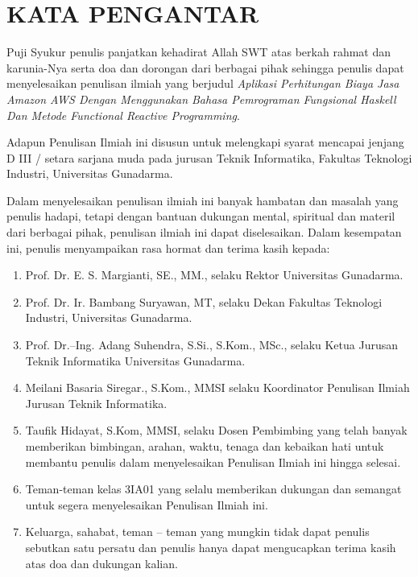 \documentclass[pi.tex]{subfile}
\begin{document}
\chapter*{KATA PENGANTAR}

Puji Syukur penulis panjatkan kehadirat Allah SWT atas berkah rahmat dan karunia-Nya serta doa dan dorongan dari berbagai pihak sehingga penulis dapat menyelesaikan penulisan ilmiah yang berjudul \emph{Aplikasi Perhitungan Biaya Jasa Amazon AWS Dengan Menggunakan Bahasa Pemrograman Fungsional Haskell Dan Metode Functional Reactive Programming}.

Adapun Penulisan Ilmiah ini disusun untuk melengkapi syarat mencapai jenjang D III / setara sarjana muda pada jurusan Teknik Informatika, Fakultas Teknologi Industri, Universitas Gunadarma.

Dalam menyelesaikan penulisan ilmiah ini banyak hambatan dan masalah yang penulis hadapi, tetapi dengan bantuan dukungan mental, spiritual dan materil dari berbagai pihak, penulisan ilmiah ini dapat diselesaikan. Dalam kesempatan ini, penulis menyampaikan rasa hormat dan terima kasih kepada:

\begin{enumerate}
  \item Prof. Dr. E. S. Margianti, SE., MM., selaku Rektor Universitas Gunadarma.

  \item Prof. Dr. Ir. Bambang Suryawan, MT, selaku Dekan Fakultas Teknologi Industri, Universitas Gunadarma.

  \item Prof. Dr.$–$Ing. Adang Suhendra, S.Si., S.Kom., MSc.,  selaku Ketua Jurusan Teknik Informatika Universitas Gunadarma.

  \item Meilani Basaria Siregar., S.Kom., MMSI selaku Koordinator Penulisan Ilmiah Jurusan Teknik Informatika.

  \item Taufik Hidayat, S.Kom, MMSI, selaku Dosen Pembimbing yang telah banyak memberikan bimbingan, arahan, waktu, tenaga dan kebaikan hati untuk membantu penulis dalam menyelesaikan Penulisan Ilmiah ini hingga selesai.

  \item Teman-teman kelas 3IA01 yang selalu memberikan dukungan dan semangat untuk segera menyelesaikan Penulisan Ilmiah ini.

  \item Keluarga, sahabat, teman $–$ teman yang mungkin tidak dapat penulis sebutkan satu persatu dan penulis hanya dapat mengucapkan terima kasih atas doa dan dukungan kalian.
\end{enumerate}
\pagebreak
\end{document}
